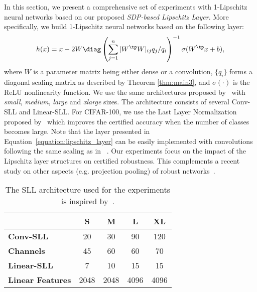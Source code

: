 \documentclass{article} \usepackage{iclr2023_conference,times}
\newcommand{\0}{\mathbf{0} }
\begin{document}
In this section, we present a comprehensive set of experiments with 1-Lipschitz neural networks based on our proposed \textit{SDP-based Lipschitz Layer}.
More specifically, we build 1-Lipschitz neural networks based on the following layer:
\begin{equation}\label{equation:lipschitz_layer}
  h(x) = x - 2W\diag\left(\sum_{j=1}^n |W^\tp W|_{ij}q_j/q_i \right)
  ^{-1}\sigma(W^\tp x+b),
\end{equation}
where $W$ is a parameter matrix being either dense or a convolution, $\{q_i\}$ forms a diagonal scaling matrix as described by Theorem \ref{thm:main3},  and $\sigma(\cdot)$ is the ReLU nonlinearity function.
We use the same architectures proposed by~\cite{meunier2022dynamical} with \textit{small}, \textit{medium}, \textit{large} and \textit{xlarge} sizes.
The architecture consists of several Conv-SLL and Linear-SLL.
For CIFAR-100, we use the Last Layer Normalization proposed by~\cite{singla2022improved} which improves the certified accuracy when the number of classes becomes large. 
Note that the layer presented in Equation~\eqref{equation:lipschitz_layer} can be easily implemented with convolutions following the same scaling as in ~\cite{prach2022almost}. Our experiments focus on the impact of the Lipschitz layer structures on certified robustness.
This complements a recent study on other aspects (e.g. projection pooling) of  robust networks~\citep{singla2022}.

\begin{wraptable}{r}{5.8cm}
    \centering
    \vspace{-0.0cm}
    \caption{The SLL architecture used for the experiments is inspired by~\citeauthor{meunier2022dynamical}.}
    \label{table:models_sizes}
    {\scriptsize
    \vspace{-0.3cm}
    \begin{tabular}{lcccc}
    \toprule
     & \textbf{S} & \textbf{M} & \textbf{L} & \textbf{XL} \\
    \midrule
    \textbf{Conv-SLL}        &   20 &   30 &   90 &  120 \\
    \textbf{Channels}        &   45 &   60 &   60 &   70 \\ 
    \textbf{Linear-SLL}      &    7 &   10 &   15 &   15 \\
    \textbf{Linear Features} & 2048 & 2048 & 4096 & 4096 \\
    \bottomrule
    \end{tabular}}
    \vspace{-0.1cm}
\end{wraptable}
\end{document}
